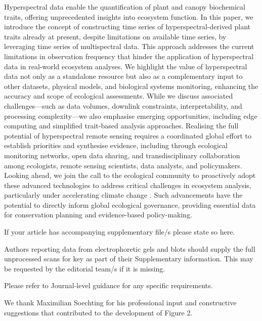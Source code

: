 \documentclass[pdflatex,sn-mathphys-num]{sn-jnl}%
\theoremstyle{thmstyleone}%
\theoremstyle{thmstyletwo}%
\theoremstyle{thmstylethree}%
\begin{document}
Hyperspectral data enable the quantification of plant and canopy biochemical traits, offering unprecedented insights into ecosystem function. In this paper, we introduce the concept of constructing time series of hyperspectral-derived plant traits already at present, despite limitations on available time series, by leveraging time series of multispectral data. This approach addresses the current limitations in observation frequency that hinder the application of hyperspectral data in real-world ecosystem analyses. We highlight the value of hyperspectral data not only as a standalone resource but also as a complementary input to other datasets, physical models, and biological systems monitoring, enhancing the accuracy and scope of ecological assessments. While we discuss associated challenges—such as data volumes, downlink constraints, interpretability, and processing complexity—we also emphasise emerging opportunities, including edge computing and simplified trait-based analysis approaches. Realising the full potential of hyperspectral remote sensing requires a coordinated global effort to establish priorities and synthesise evidence, including through ecological monitoring networks, open data sharing, and transdisciplinary collaboration among ecologists, remote sensing scientists, data analysts, and policymakers. Looking ahead, we join the call to the ecological community to proactively adopt these advanced technologies to address critical challenges in ecosystem analysis, particularly under accelerating climate change \cite{cavender2025spectral}. Such advancements have the potential to directly inform global ecological governance, providing essential data for conservation planning and evidence-based policy-making.




If your article has accompanying supplementary file/s please state so here. 

Authors reporting data from electrophoretic gels and blots should supply the full unprocessed scans for key as part of their Supplementary information. This may be requested by the editorial team/s if it is missing.

Please refer to Journal-level guidance for any specific requirements.


We thank Maximilian Soechting for his professional input and constructive suggestions that contributed to the development of Figure 2.
\end{document}
